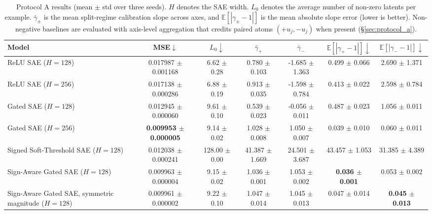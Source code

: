 \documentclass{article}
\begin{document}
\begin{table}[t]
    \centering
    \caption{Protocol A results (mean $\pm$ std over three seeds). $H$ denotes the SAE width. $L_0$ denotes the average number
    of non-zero latents per example. $\bar{\gamma}_\pm$ is the mean split-regime calibration slope across axes, and
    $\mathbb{E}[|\gamma_\pm-1|]$ is the mean absolute slope error (lower is better). Non-negative baselines are evaluated with
    axis-level aggregation that credits paired atoms $(+u_j,-u_j)$ when present (\S\ref{sec:protocol_a}).}
    \label{tab:protocol_a_results}
    \small\begin{tabular}{lcccccc}
        \toprule
        Model & MSE$\downarrow$ & $L_0\downarrow$ & $\bar{\gamma}_+$ & $\bar{\gamma}_-$ & $\mathbb{E}[|\gamma_+-1|]\downarrow$ & $\mathbb{E}[|\gamma_--1|]\downarrow$ \\
        \midrule
        ReLU SAE ($H=128$)
            & 0.017987 $\pm$ 0.001168 & 6.62 $\pm$ 0.28
            & 0.780 $\pm$ 0.103 & -1.685 $\pm$ 1.363
            & 0.499 $\pm$ 0.066 & 2.690 $\pm$ 1.371 \\
        ReLU SAE ($H=256$)
            & 0.017138 $\pm$ 0.000286 & 6.88 $\pm$ 0.19
            & 0.913 $\pm$ 0.035 & -1.598 $\pm$ 0.784
            & 0.413 $\pm$ 0.022 & 2.598 $\pm$ 0.784 \\
        Gated SAE ($H=128$)
            & 0.012945 $\pm$ 0.000060 & 9.61 $\pm$ 0.10
            & 0.539 $\pm$ 0.023 & -0.056 $\pm$ 0.011
            & 0.487 $\pm$ 0.023 & 1.056 $\pm$ 0.011 \\
        Gated SAE ($H=256$)
            & \textbf{0.009953 $\pm$ 0.000005} & 9.14 $\pm$ 0.02
            & 1.028 $\pm$ 0.008 & 1.050 $\pm$ 0.007
            & 0.039 $\pm$ 0.010 & 0.060 $\pm$ 0.011 \\
        Signed Soft-Threshold SAE ($H=128$)
            & 0.012038 $\pm$ 0.000241 & 128.00 $\pm$ 0.00
            & 41.387 $\pm$ 1.669 & 24.501 $\pm$ 3.687
            & 43.457 $\pm$ 1.053 & 31.385 $\pm$ 4.389 \\
        Sign-Aware Gated SAE ($H=128$)
            & 0.009963 $\pm$ 0.000004 & 9.15 $\pm$ 0.02
            & 1.036 $\pm$ 0.001 & 1.053 $\pm$ 0.002
            & \textbf{0.036 $\pm$ 0.001} & 0.053 $\pm$ 0.002 \\
        Sign-Aware Gated SAE, symmetric magnitude ($H=128$)
            & 0.009961 $\pm$ 0.000002 & 9.22 $\pm$ 0.10
            & 1.047 $\pm$ 0.014 & 1.045 $\pm$ 0.013
            & 0.047 $\pm$ 0.014 & \textbf{0.045 $\pm$ 0.013} \\
        \bottomrule
    \end{tabular}
\end{table}
\end{document}
